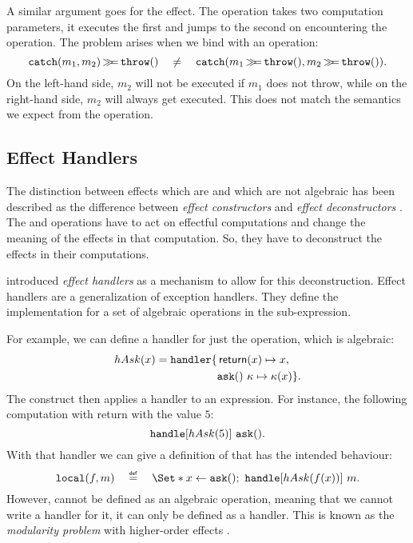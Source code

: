 A similar argument goes for the  effect. The \ocatch operation takes two computation parameters, it executes the first and jumps to the second on encountering the \othrow operation. The problem arises when we bind with an \othrow operation:
\[
    \mathtt{catch}(m_1, m_2) \operatorname{\mathtt{\gg\!\!=}} \mathtt{throw}() \quad\neq\quad \mathtt{catch}(m_1\operatorname{\mathtt{\gg\!\!=}}\mathtt{throw}(), m_2\operatorname{\mathtt{\gg\!\!=}}\mathtt{throw}()).
\]
On the left-hand side, $m_2$ will not be executed if $m_1$ does not throw, while on the right-hand side, $m_2$ will always get executed. This does not match the semantics we expect from the \ocatch operation.

\subsection{Effect Handlers}

The distinction between effects which are and which are not algebraic has been described as the difference between \emph{effect constructors} and \emph{effect deconstructors} \autocite{plotkin_algebraic_2003}. The \olocal and \ocatch operations have to act on effectful computations and change the meaning of the effects in that computation. So, they have to deconstruct the effects in their computations.

\textcite{castagna_handlers_2009} introduced \emph{effect handlers} as a mechanism to allow for this deconstruction. Effect handlers are a generalization of exception handlers. They define the implementation for a set of algebraic operations in the sub-expression.

For example, we can define a handler for just the \oask operation, which is algebraic:
\[
    hAsk(x) = \text{\texttt{handler}} \{
        \begin{aligned}[t]
            &\operatorname{\mathsf{return}}(x) \mapsto x, \\
            &\mathtt{ask}()\ \kappa \mapsto \kappa(x) \}.\\
        \end{aligned}
\]
The \handle construct then applies a handler to an expression. For instance, the following computation with return with the value $5$:
\[
    \text{\texttt{handle}}[hAsk(5)]\ \mathtt{ask}().
\]
With that handler we can give a definition of \olocal that has the intended behaviour:
\[
    \olocal(f, m) \quad\defeq\quad \S{x \gets \oask()\seq \handle[hAsk(f(x))]\ m}.
\]
However, \olocal cannot be defined as an algebraic operation, meaning that we cannot write a handler for it, it can only be defined as a handler. This is known as the \emph{modularity problem} with higher-order effects \autocite{wu_effect_2014}.

